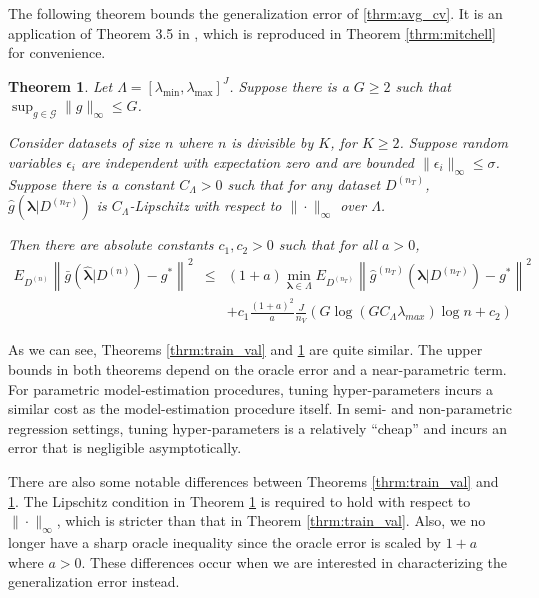\documentclass[12pt]{article}
\newtheorem{theorem}{Theorem}
\begin{document}
The following theorem bounds the generalization error of \eqref{thrm:avg_cv}. It is an application of Theorem 3.5 in \citet{lecue2012oracle}, which is reproduced in Theorem \ref{thrm:mitchell} for convenience.

\begin{theorem}
\label{thrm:kfold}
Let $\Lambda = [\lambda_{\min}, \lambda_{\max}]^J$. Suppose there is a $G \ge  2$ such that $\sup_{g \in \mathcal{G}} \|g\|_\infty \le G$.

Consider datasets of size $n$ where $n$ is divisible by $K$, for $K \ge 2$.
Suppose random variables $\epsilon_i$ are independent with expectation zero and are bounded $\| \epsilon_i \|_\infty \le \sigma$. Suppose there is a constant $C_\Lambda >0$ such that for any dataset $D^{(n_T)}$, $\hat g (\boldsymbol{\lambda} | D^{(n_T)})$ is $C_\Lambda$-Lipschitz with respect to $\| \cdot \|_\infty$ over $\Lambda$.

Then there are absolute constants $c_1, c_2 > 0$ such that for all $a > 0$,
\begin{eqnarray}
E_{D^{(n)}} \left \| \bar{g} ( \hat{\boldsymbol \lambda} | {D^{(n)}} ) - g^* \right \|^2 &\le&
(1+a) \min_{\boldsymbol{\lambda} \in \Lambda}  E_{D^{(n_T)}} \left \| \hat{g}^{(n_T)}(\boldsymbol \lambda | D^{(n_T)}) - g^* \right \|^2 \\
&& + c_1 \frac{(1+a)^2}{a} \frac{J}{n_V} 
\left (
G \log (GC_\Lambda \lambda_{max} ) \log n + c_2
\right )
\end{eqnarray}
\end{theorem}

As we can see, Theorems \ref{thrm:train_val} and \ref{thrm:kfold} are quite similar. The upper bounds in both theorems depend on the oracle error and a near-parametric term. For parametric model-estimation procedures, tuning hyper-parameters incurs a similar cost as the model-estimation procedure itself. In semi- and non-parametric regression settings, tuning hyper-parameters is a relatively ``cheap'' and incurs an error that is negligible asymptotically.

There are also some notable differences between Theorems \ref{thrm:train_val} and \ref{thrm:kfold}. The Lipschitz condition in Theorem \ref{thrm:kfold} is required to hold with respect to $\| \cdot \|_\infty$, which is stricter than that in Theorem \ref{thrm:train_val}. Also, we no longer have a sharp oracle inequality since the oracle error is scaled by $1+a$ where $a > 0$. These differences occur when we are interested in characterizing the generalization error instead.
\end{document}
